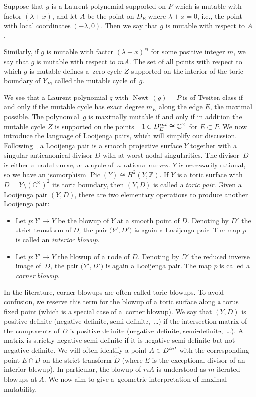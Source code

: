\documentclass[11pt]{article}
\numberwithin{equation}{section}
\DeclareMathOperator{\Newt}{{Newt \,}}
\DeclareMathOperator{\Pic}{{Pic}}
\newcommand{\CC}{\mathbb{C}}
\newcommand{\ZZ}{\mathbb{Z}}
\begin{document}
	\begin{Definition}\label{def:mutablecycle}
		Suppose that $g$ is a Laurent polynomial supported on $P$ which is mutable with factor $(\lambda +x)$, and let $A$ be the point on $D_E$ where $\lambda+x=0$, i.e., the point with local coordinates $(-\lambda, 0)$. Then we say that $g$ is mutable with respect to $A$.

		Similarly, if $g$ is mutable with factor $(\lambda+x)^m$ for some positive integer $m$, we say that $g$ is mutable with respect to $m A$.
		The set of all points with respect to which $g$ is mutable defines a~zero cycle $Z$ supported on the interior of the toric boundary of $Y_P$, called the mutable cycle of~$g$.
	\end{Definition}
	We see that a Laurent polynomial $g$ with $\Newt(g)=P$ is of Tveiten class if and only if the mutable cycle has exact degree $m_E$ along the edge $E$, the maximal possible. The polynomial~$g$ is maximally mutable if and only if in addition the mutable cycle $Z$ is supported on the points $-1 \in D_E^{\rm int} \cong \CC^\times$ for $E \subset P$.
We now introduce the language of Looijenga pairs, which will simplify our discussion.
Following~\cite{Friedman, GrossHackingKeelLooijengapairs}, a Looijenga pair is a smooth projective surface $Y$ together with a singular anticanonical divisor $D$ with at worst nodal singularities. The divisor~$D$ is either a~nodal curve, or a cycle of~$n$ rational curves. $Y$ is necessarily rational, so we have an isomorphism $\Pic(Y) \cong H^2(Y, \ZZ)$.
If $Y$ is a toric surface with $D=Y \setminus (\CC^\times)^2$ its toric boundary, then $(Y,D)$ is called a {\it toric pair}.
Given a Looijenga pair $(Y, D)$, there are two elementary operations to produce another Looijenga pair:
\begin{itemize}\itemsep=0pt
	\item
	Let $p \colon Y' \rightarrow Y$ be the blowup of $Y$ at a smooth point of $D$. Denoting by $D'$ the strict transform of $D$, the pair $\bigl(Y', D'\bigr)$ is again a Looijenga pair. The map $p$ is called an \emph{interior blowup}.
	\item
	Let $p \colon Y' \rightarrow Y$ the blowup of a node of $D$. Denoting by $D'$ the reduced inverse image of~$D$, the pair $\bigl(Y', D'\bigr)$ is again a Looijenga pair. The map $p$ is called a \emph{corner blowup}.
\end{itemize}
	In the literature, corner blowups are often called toric blowups. To avoid confusion, we reserve this term for the blowup of a toric surface along a torus fixed point (which is a special case of a~corner blowup).
	We say that $(Y, D)$ is positive definite (negative definite, semi-definite,~\dots) if the intersection matrix of the components of $D$ is positive definite (negative definite, semi-definite,~\dots). A matrix is strictly negative semi-definite if it is negative semi-definite but not negative definite.
We will often identify a point $A \in D^{\rm int}$ with the corresponding point $E \cap \tilde{D}$ on the strict transform $\tilde{D}$ (where $E$ is the exceptional divisor of an interior blowup). In particular, the blowup of $m A$ is understood as $m$ iterated blowups at $A$.
We now aim to give a~geometric interpretation of maximal mutability.
\end{document}
